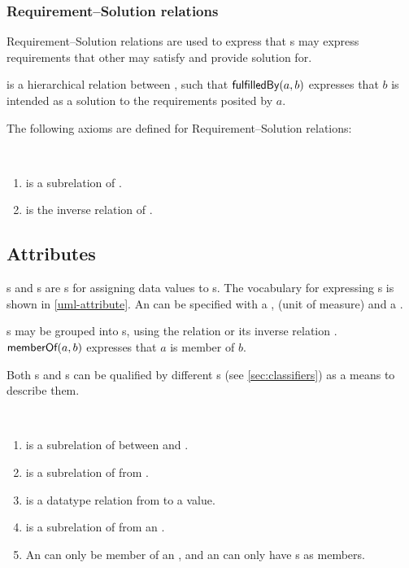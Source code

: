 \subsubsection{Requirement--Solution relations}

Requirement--Solution relations are used to express that s
may express requirements that other  may satisfy and
provide solution for.

 is a hierarchical relation between , such
that $\textsf{fulfilledBy}(a,b)$ expresses that $b$ is intended as a
solution to the requirements posited by $a$.

The following axioms are defined for Requirement--Solution relations:
\begin{axioms}~
  \begin{enumerate}[resume=axioms,{label=(\arabic*)}]
  \item {} is a subrelation of .
  \item {} is the inverse relation of .
  \end{enumerate}
\end{axioms}



\subsection{Attributes}
\label{sec:attributes}

s and s are s for assigning data values to s.
%
The vocabulary for expressing s is shown in \autoref{uml-attribute}.
%
An  can be specified with a , 
(unit of measure) and a .

s may be grouped into
s, using the relation  or its inverse relation .
$\textsf{memberOf}(a,b)$ expresses that $a$ is member of $b$.

Both s and
s can be qualified by different s (see
\autoref{sec:classifiers}) as a means to describe them.

\begin{axioms}~
  \begin{enumerate}[resume=axioms,{label=(\arabic*)}]
  \item {} is a subrelation of  between  and .
  \item {} is a subrelation of  from .
  \item {} is a datatype relation from  to a value.
  \item {} is a subrelation of  from an .
  \item An  can only be member of an , and
    an  can only have s as members.
  \end{enumerate}
\end{axioms}



